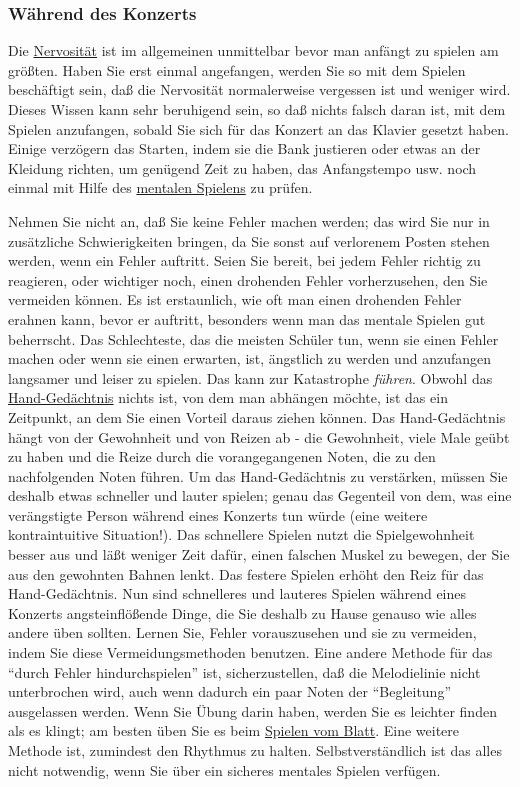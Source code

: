 
\subsubsection{Während des Konzerts}
\label{c1iii14g}

Die \hyperref[c1iii15]{Nervosität} ist im allgemeinen unmittelbar bevor man anfängt zu spielen am größten.
Haben Sie erst einmal angefangen, werden Sie so mit dem Spielen beschäftigt sein, daß die Nervosität normalerweise vergessen ist und weniger wird.
Dieses Wissen kann sehr beruhigend sein, so daß nichts falsch daran ist, mit dem Spielen anzufangen, sobald Sie sich für das Konzert an das Klavier gesetzt haben.
Einige verzögern das Starten, indem sie die Bank justieren oder etwas an der Kleidung richten, um genügend Zeit zu haben, das Anfangstempo usw. noch einmal mit Hilfe des \hyperref[c1ii12mental]{mentalen Spielens} zu prüfen.

Nehmen Sie nicht an, daß Sie keine Fehler machen werden; das wird Sie nur in zusätzliche Schwierigkeiten bringen, da Sie sonst auf verlorenem Posten stehen werden, wenn ein Fehler auftritt.
Seien Sie bereit, bei jedem Fehler richtig zu reagieren, oder wichtiger noch, einen drohenden Fehler vorherzusehen, den Sie vermeiden können.
Es ist erstaunlich, wie oft man einen drohenden Fehler erahnen kann, bevor er auftritt, besonders wenn man das mentale Spielen gut beherrscht.
Das Schlechteste, das die meisten Schüler tun, wenn sie einen Fehler machen oder wenn sie einen erwarten, ist, ängstlich zu werden und anzufangen langsamer und leiser zu spielen.
Das kann zur Katastrophe \textit{führen}.
Obwohl das \hyperref[c1iii6d]{Hand-Gedächtnis} nichts ist, von dem man abhängen möchte, ist das ein Zeitpunkt, an dem Sie einen Vorteil daraus ziehen können.
Das Hand-Gedächtnis hängt von der Gewohnheit und von Reizen ab - die Gewohnheit, viele Male geübt zu haben und die Reize durch die vorangegangenen Noten, die zu den nachfolgenden Noten führen.
Um das Hand-Gedächtnis zu verstärken, müssen Sie deshalb etwas schneller und lauter spielen; genau das Gegenteil von dem, was eine verängstigte Person während eines Konzerts tun würde (eine weitere kontraintuitive Situation!).
Das schnellere Spielen nutzt die Spielgewohnheit besser aus und läßt weniger Zeit dafür, einen falschen Muskel zu bewegen, der Sie aus den gewohnten Bahnen lenkt.
Das festere Spielen erhöht den Reiz für das Hand-Gedächtnis.
Nun sind schnelleres und lauteres Spielen während eines Konzerts angsteinflößende Dinge, die Sie deshalb zu Hause genauso wie alles andere üben sollten.
Lernen Sie, Fehler vorauszusehen und sie zu vermeiden, indem Sie diese Vermeidungsmethoden benutzen.
Eine andere Methode für das \enquote{durch Fehler hindurchspielen} ist, sicherzustellen, daß die Melodielinie nicht unterbrochen wird, auch wenn dadurch ein paar Noten der \enquote{Begleitung} ausgelassen werden.
Wenn Sie Übung darin haben, werden Sie es leichter finden als es klingt; am besten üben Sie es beim \hyperref[c1iii11]{Spielen vom Blatt}.
Eine weitere Methode ist, zumindest den Rhythmus zu halten.
Selbstverständlich ist das alles nicht notwendig, wenn Sie über ein sicheres mentales Spielen verfügen.

